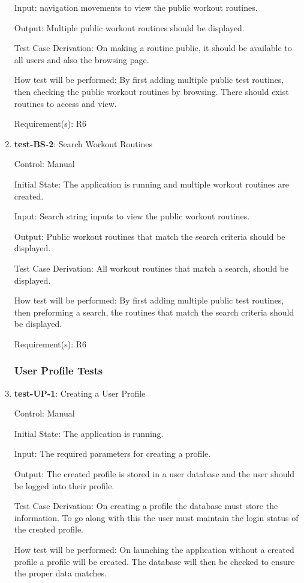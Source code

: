 \documentclass[12pt, titlepage]{article}
\begin{document}
\begin{enumerate}
		Input: navigation movements to view the public workout routines.
		
		Output: Multiple public workout routines should be displayed. 
		
		Test Case Derivation: On making a routine public, it should be available to all users and also the browsing page.
		
		How test will be performed: By first adding multiple public test routines, then checking the public workout routines by browsing. There should exist routines to access and view.
		
		Requirement(s): R6
		
		\item{\textbf{test-BS-2}}: Search Workout Routines
		
		Control: Manual
		
		Initial State: The application is running and multiple workout routines are created.
		
		Input: Search string inputs to view the public workout routines.
		
		Output: Public workout routines that match the search criteria should be displayed. 
		
		Test Case Derivation: All workout routines that match a search, should be displayed.
		
		How test will be performed: By first adding multiple public test routines, then preforming a search, the routines that match the search criteria should be displayed.
		
		Requirement(s): R6
		
		\subsubsection{User Profile Tests}
		\item{\textbf{test-UP-1}}: Creating a User Profile
		
		Control: Manual
		
		Initial State: The application is running.
		
		Input: The required parameters for creating a profile.
		
		Output: The created profile is stored in a user database and the user should be logged into their profile.
		
		Test Case Derivation: On creating a profile the database must store the information. To go along with this the user must maintain the login status of the created profile.
		
		How test will be performed: On launching the application without a created profile a profile will be created. The database will then be checked to ensure the proper data matches.
		

\end{enumerate}
\end{document}
